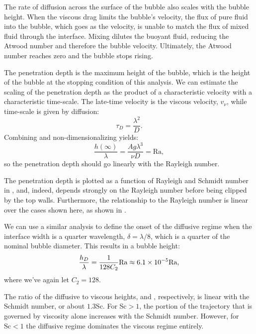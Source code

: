 The rate of diffusion across the surface of the bubble also scales with the bubble height.
When the viscous drag limits the bubble's velocity, the flux of pure fluid into the bubble, which goes as the velocity, is unable to match the flux of mixed fluid through the interface.
Mixing dilutes the buoyant fluid, reducing the Atwood number and therefore the bubble velocity.
Ultimately, the Atwood number reaches zero and the bubble stops rising.

The penetration depth is the maximum height of the bubble, which is the height of the bubble at the stopping condition of this analysis.
We can estimate the scaling of the penetration depth as the product of a characteristic velocity with a characteristic time-scale.
The late-time velocity is the viscous velocity, $v_\nu$, while time-scale is given by diffusion:
\begin{equation}
\tau_D = \frac{\lambda^2}{D}.
\end{equation}
Combining and non-dimensionalizing yields:
\begin{equation}
\frac{h(\infty)}{\lambda} = \frac{A g \lambda^3}{\nu D} = \text{Ra},
\end{equation}
so the penetration depth should go linearly with the Rayleigh number.

The penetration depth is plotted as a function of Rayleigh and Schmidt number in , and, indeed, depends strongly on the Rayleigh number before being clipped by the top walls.
Furthermore, the relationship to the Rayleigh number is linear over the cases shown here, as shown in .

We can use a similar analysis to define the onset of the diffusive regime when the interface width is a quarter wavelength, $\delta = \lambda / 8$, which is a quarter of the nominal bubble diameter.
This results in a bubble height:
\begin{equation} \elabel{diff_height}
\frac{h_D}{\lambda} = \frac{1}{128 C_2} \text{Ra} \approx 6.1 \times 10^{-5} \text{Ra},
\end{equation}
where we've again let $C_2 = 128$.

The ratio of the diffusive to viscous heights,  and , respectively, is linear with the Schmidt number, or about $1.3 \text{Sc}$.
For $\text{Sc} > 1$, the portion of the trajectory that is governed by viscosity alone increases with the Schmidt number.
However, for $\text{Sc} < 1$ the diffusive regime dominates the viscous regime entirely.

